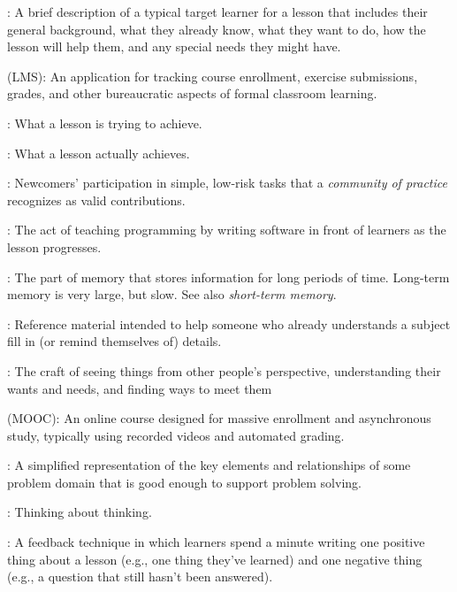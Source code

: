 \begin{description}
: A brief description of a typical
target learner for a lesson that includes their general background, what they
already know, what they want to do, how the lesson will help them, and any
special needs they might have.

 (LMS): An application for tracking course
enrollment, exercise submissions, grades, and other bureaucratic aspects of
formal classroom learning.

: What a lesson is trying to
achieve.

: What a lesson actually achieves.

: Newcomers' participation in simple, low-risk tasks that a
\emph{community of practice} recognizes as valid contributions.

: The act of teaching programming by writing
software in front of learners as the lesson progresses.

: The part of memory that stores
information for long periods of time. Long-term memory is very large, but
slow. See also \emph{short-term memory}.

: Reference material intended to help someone who
already understands a subject fill in (or remind themselves of) details.

: The craft of seeing things from other people's
perspective, understanding their wants and needs, and finding ways to meet them

 (MOOC): An online course designed
for massive enrollment and asynchronous study, typically using recorded videos
and automated grading.

: A simplified representation of the key
elements and relationships of some problem domain that is good enough to support
problem solving.

: Thinking about thinking.

: A feedback technique in which learners
spend a minute writing one positive thing about a lesson (e.g., one thing
they've learned) and one negative thing (e.g., a question that still hasn't been
answered).


\end{description}
